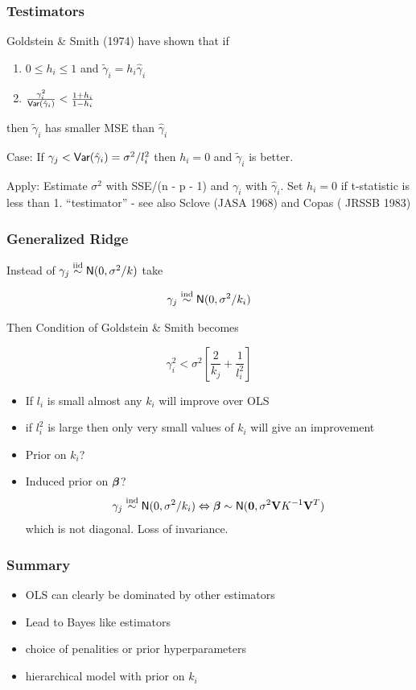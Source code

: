 \documentclass[handout]{beamer}
\begin{document}
\begin{frame} \frametitle{Testimators}

Goldstein \& Smith (1974) have shown that if

\begin{enumerate}
\item
$0 \leq  h_i \leq 1$ and  $\tilde{\gamma}_i = h_i \hat{\gamma}_i$  
\item $\frac{\gamma^2_i}{\textsf{Var}(\hat{\gamma}_i)} < \frac{1 + h_i}{1 - h_i}$
\end{enumerate}
then   $\tilde{\gamma}_i$ has smaller MSE than $\hat{\gamma}_i$

\vspace{14pt}
Case:  If $\gamma_j < \textsf{Var}(\hat{\gamma}_i) = \sigma^2/l_i^2$  then
$h_i = 0$ and $\tilde{\gamma}_i$ is better.

\vspace{11pt}
Apply: Estimate $\sigma^2$ with SSE/(n - p - 1) and $\gamma_i$ with
$\hat{\gamma}_i$.  Set $h_i = 0$ if t-statistic is less than 1.
\vfill 
``testimator'' - see also Sclove (JASA 1968) and Copas ( JRSSB 1983)
\end{frame}
\begin{frame} \frametitle{Generalized Ridge}


Instead of $\gamma_j \mathrel{\mathop{\sim}\limits^{\rm iid}} \textsf{N}(0, \sigma^2/k)$ take 

$$\gamma_j \mathrel{\mathop{\sim}\limits^{\rm ind}} \textsf{N}(0, \sigma^2/k_i)$$  \pause

Then Condition of Goldstein \& Smith becomes

$$
\gamma_i^2 < \sigma^2\left[ \frac{2}{k_j} + \frac{1}{l_i^2}  \right]
$$ \pause
\begin{itemize}
\item 
If $l_i$ is small almost any $k_i$ will improve over OLS \pause
\item 
if $l_i^2$ is large then only very small values of $k_i$ will give an
improvement \pause
\item Prior on $k_i$?   \pause
\item Induced prior on $\boldsymbol{\beta}$?  
$$\gamma_j \mathrel{\mathop{\sim}\limits^{\rm ind}} \textsf{N}(0, \sigma^2/k_i) \Leftrightarrow 
\boldsymbol{\beta} \sim \textsf{N}(\mathbf{0}, \sigma^2 \mathbf{V} K^{-1} \mathbf{V}^T)$$
which is not diagonal.   Loss of invariance.
\end{itemize}

\end{frame}
\begin{frame} \frametitle{Summary }

  \begin{itemize}
  \item OLS can clearly be dominated by other estimators
  \item Lead to Bayes like estimators
  \item choice of penalities or prior hyperparameters
  \item hierarchical model with prior on $k_i$
  \end{itemize}

\end{frame}
\end{document}
